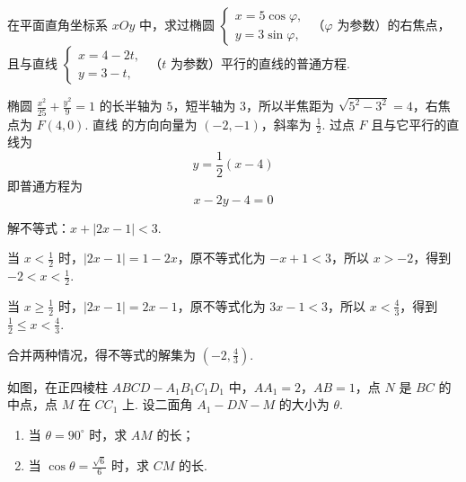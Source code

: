 \reuseproblemnumber
\begin{problem}[C]
在平面直角坐标系 \(xOy\) 中，求过椭圆 \(\begin{cases}
x=5\cos\varphi,\\
y=3\sin\varphi,
\end{cases}\)
（\(\varphi\) 为参数）的右焦点，且与直线 \(\begin{cases}
x=4-2t,\\
y=3-t,
\end{cases}\)
（\(t\) 为参数）平行的直线的普通方程.
\end{problem}

\begin{solution}
椭圆 \(\frac{x^2}{25}+\frac{y^2}{9}=1\) 的长半轴为 \(5\)，短半轴为 \(3\)，所以半焦距为 \(\sqrt{5^2-3^2}=4\)，右焦点为 \(F(4,0)\). 直线
的方向向量为 \((-2,-1)\)，斜率为 \(\frac{1}{2}\). 过点 \(F\) 且与它平行的直线为
\[
y=\frac{1}{2}(x-4)
\]
即普通方程为
\[
x-2y-4=0
\]
\end{solution}

\reuseproblemnumber
\begin{problem}[D]
解不等式：\(x+|2x-1|<3\).
\end{problem}

\begin{solution}
当 \(x<\frac{1}{2}\) 时，\(|2x-1|=1-2x\)，原不等式化为 \(-x+1<3\)，所以 \(x>-2\)，得到 \(-2<x<\frac{1}{2}\).

当 \(x\geqslant\frac{1}{2}\) 时，\(|2x-1|=2x-1\)，原不等式化为 \(3x-1<3\)，所以 \(x<\frac{4}{3}\)，得到 \(\frac{1}{2}\leqslant x<\frac{4}{3}\).

合并两种情况，得不等式的解集为 \(\left(-2,\frac{4}{3}\right)\).
\end{solution}

\begin{problem}
如图，在正四棱柱 \(ABCD-A_{1}B_{1}C_{1}D_{1}\) 中，\(AA_{1}=2\)，\(AB=1\)，点 \(N\) 是 \(BC\) 的中点，点 \(M\) 在 \(CC_{1}\) 上. 设二面角 \(A_{1}-DN-M\) 的大小为 \(\theta\).
\begin{enumerate}
\item 当 \(\theta=90^\circ\) 时，求 \(AM\) 的长；
\item 当 \(\cos\theta=\frac{\sqrt{6}}{6}\) 时，求 \(CM\) 的长.
\end{enumerate}
\end{problem}

